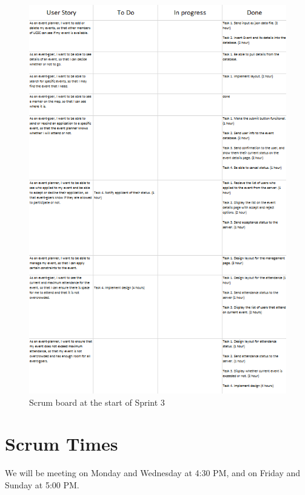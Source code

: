 \documentclass[10pt]{article}
\newcommand{\fancysecX}[2] {{\color{primary}\section*{#1} \label{sec:#2}}}
\begin{document}
   \begin{figure}[!ht]
  	
  	\centering
    		\includegraphics[width=1\textwidth]{scrumboard3}
    \caption{Scrum board at the start of Sprint 3}
\end{figure}

\fancysecX{Scrum Times}{scrumTimes}

    We will be meeting on Monday and Wednesday at 4:30 PM, and on Friday and Sunday at 5:00 PM.
\end{document}
